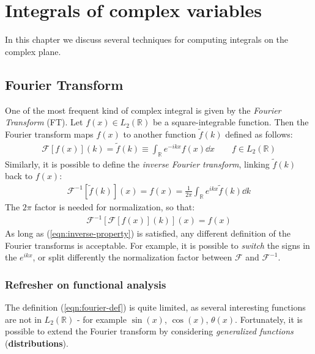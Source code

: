 \documentclass[../template.tex]{subfiles}
\begin{document}
\chapter{Integrals of complex variables}
In this chapter we discuss several techniques for computing integrals on the complex plane.

\section{Fourier Transform}
\label{sec:fourier}
One of the most frequent kind of complex integral is given by the \textit{Fourier Transform} (FT). Let $f(x) \in L_2(\mathbb{R})$ be a square-integrable function. Then the Fourier transform maps $f(x)$ to another function $\tilde{f}(k)$ defined as follows: 
\begin{align} \label{eqn:fourier-def}
    \mathcal{F}[f(x)](k) = \tilde{f}(k) \equiv \int_{\mathbb{R}} e^{-ikx} f(x) \dd{x} \qquad f \in L_2(\mathbb{R})
\end{align}
Similarly, it is possible to define the \textit{inverse Fourier transform}, linking $\tilde{f}(k)$ back to $f(x)$: 
\begin{align*}
    \mathcal{F}^{-1}[\tilde{f}(k)](x) = f(x) = \frac{1}{2\pi} \int_{\mathbb{R}} e^{ikx} \tilde{f}(k) \dd{k} 
\end{align*} 
The $2 \pi$ factor is needed for normalization, so that:
\begin{align}
    \mathcal{F}^{-1}[\mathcal{F}[f(x)](k)](x) = f(x) \label{eqn:inverse-property}
\end{align}
As long as (\ref{eqn:inverse-property}) is satisfied, any different  definition of the Fourier transforms is acceptable. For example, it is possible to \textit{switch} the signs in the $e^{ikx}$, or split differently the normalization factor between $\mathcal{F}$ and $\mathcal{F}^{-1}$. 

\subsection{Refresher on functional analysis}
The definition (\ref{eqn:fourier-def}) is quite limited, as several interesting functions are not in $L_2(\mathbb{R})$ - for example $\sin(x)$, $\cos(x)$, $\theta(x)$. Fortunately, it is possible to extend the Fourier transform by considering \textit{generalized functions} (\textbf{distributions}).   

\medskip
\end{document}
